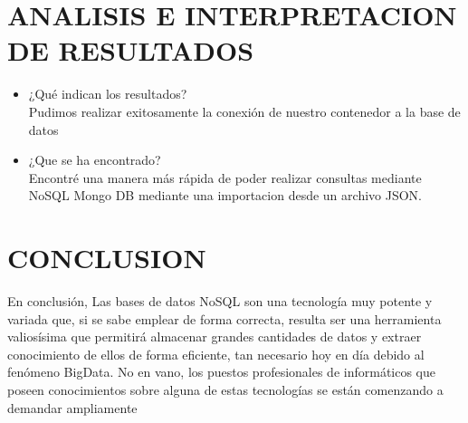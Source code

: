 \documentclass[preprint,12pt]{elsarticle}
\begin{document}
\section{ANALISIS E INTERPRETACION DE RESULTADOS }
\begin{itemize}
	\item ¿Qué indican los resultados? \\
	Pudimos realizar exitosamente la conexión de nuestro contenedor a la base de datos
	\item ¿Que se ha encontrado?\\
	Encontré una manera más rápida de poder realizar consultas mediante NoSQL Mongo DB mediante una importacion desde un archivo JSON.
\end{itemize}


\section{CONCLUSION}
En conclusión, Las bases de datos NoSQL son una tecnología muy potente y variada que, si se sabe
emplear de forma correcta, resulta ser una herramienta valiosísima que permitirá
almacenar grandes cantidades de datos y extraer conocimiento de ellos de forma
eficiente, tan necesario hoy en día debido al fenómeno BigData. No en vano, los puestos
profesionales de informáticos que poseen conocimientos sobre alguna de estas
tecnologías se están comenzando a demandar ampliamente
\end{document}
